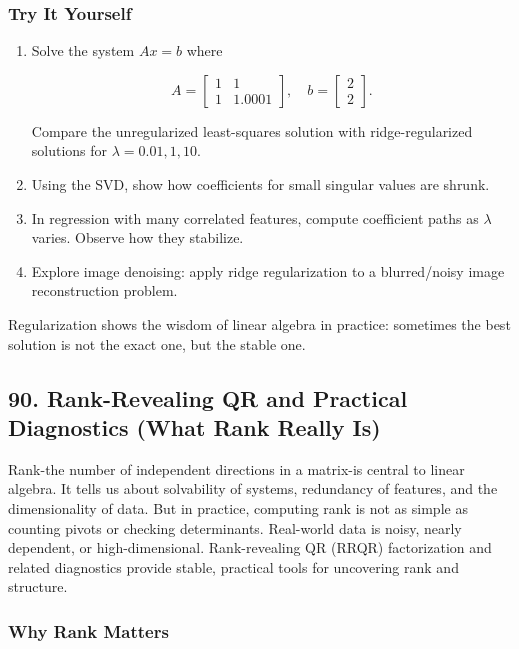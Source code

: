 \documentclass[
  letterpaper,
  DIV=11,
  numbers=noendperiod]{scrreprt}
\begin{document}
\subsubsection{Try It Yourself}\label{try-it-yourself-88}

\begin{enumerate}
\def\labelenumi{\arabic{enumi}.}
\item
  Solve the system \(Ax = b\) where

  \[
  A = \begin{bmatrix}1 & 1 \\ 1 & 1.0001\end{bmatrix}, \quad b = \begin{bmatrix}2 \\ 2\end{bmatrix}.
  \]

  Compare the unregularized least-squares solution with
  ridge-regularized solutions for \(\lambda = 0.01, 1, 10\).
\item
  Using the SVD, show how coefficients for small singular values are
  shrunk.
\item
  In regression with many correlated features, compute coefficient paths
  as \(\lambda\) varies. Observe how they stabilize.
\item
  Explore image denoising: apply ridge regularization to a blurred/noisy
  image reconstruction problem.
\end{enumerate}

Regularization shows the wisdom of linear algebra in practice: sometimes
the best solution is not the exact one, but the stable one.

\subsection{90. Rank-Revealing QR and Practical Diagnostics (What Rank
Really
Is)}\label{rank-revealing-qr-and-practical-diagnostics-what-rank-really-is}

Rank-the number of independent directions in a matrix-is central to
linear algebra. It tells us about solvability of systems, redundancy of
features, and the dimensionality of data. But in practice, computing
rank is not as simple as counting pivots or checking determinants.
Real-world data is noisy, nearly dependent, or high-dimensional.
Rank-revealing QR (RRQR) factorization and related diagnostics provide
stable, practical tools for uncovering rank and structure.

\subsubsection{Why Rank Matters}\label{why-rank-matters}
\end{document}
